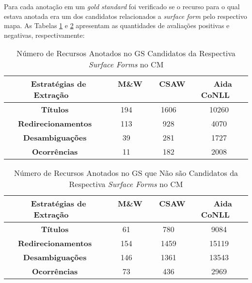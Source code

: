 \documentclass[10pt,a4paper]{llncs}
\begin{document}
{Para cada anotação em um \textit{gold standard} foi verificado se o recurso para o qual estava anotada era um dos candidatos relacionados a \textit{surface form} pelo respectivo mapa. As Tabelas \ref{tab-metrica2} e \ref{tab-metrica3} apresentam as quantidades de avaliações positivas e negativas, respectivamente:
\begin{table} \label{tab-metrica2}
\caption{Número de Recursos Anotados no GS Candidatos da Respectiva \textit{Surface Forms} no CM}
\centering
    \begin{tabular}{|c|c|c|c|}
    \hline
    ~ {\bf Estratégias de Extração} ~ 	& ~ {\bf M\&W} ~ 	& ~ {\bf CSAW} ~ 	& ~ {\bf Aida CoNLL} ~\\ \hline  
    {\bf Títulos} 			& 194			& 1606			& 10260 \\ \hline
    {\bf Redirecionamentos} 		& 113			& 928			& 4070 \\ \hline
    {\bf Desambiguações} 		& 39			& 281			& 1727 \\ \hline
    {\bf Ocorrências} 			& 11			& 182			& 2008 \\ \hline
    \end{tabular}
\end{table}
\begin{table} \label{tab-metrica3}
\caption{Número de Recursos Anotados no GS que Não são Candidatos da Respectiva \textit{Surface Forms} no CM}
\centering
    \begin{tabular}{|c|c|c|c|}
    \hline
    ~ {\bf Estratégias de Extração} ~ 	& ~ {\bf M\&W} ~ 	& ~ {\bf CSAW} ~ 	& ~ {\bf Aida CoNLL} ~\\ \hline  
    {\bf Títulos} 			& 61			& 780			& 9084 \\ \hline
    {\bf Redirecionamentos} 		& 154			& 1459			& 15119 \\ \hline
    {\bf Desambiguações} 		& 146			& 1361			& 13543 \\ \hline
    {\bf Ocorrências} 			& 73			& 436			& 2969 \\ \hline
    \end{tabular}
\end{table}

}
\end{document}
